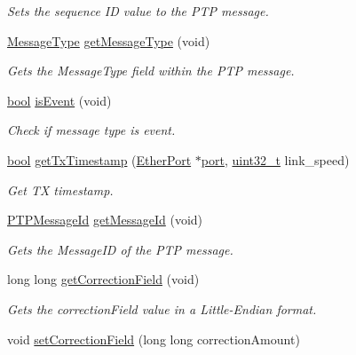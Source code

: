 \begin{DoxyCompactItemize}
\begin{DoxyCompactList}\small\item\em Sets the sequence ID value to the P\+TP message. \end{DoxyCompactList}\item 
\hyperlink{avbts__message_8hpp_ac6606ebe91c8ac66a2c314c79f5ab013}{Message\+Type} \hyperlink{class_p_t_p_message_common_aa9e0a02eadc0da0ddbade7fdb09d9309}{get\+Message\+Type} (void)
\begin{DoxyCompactList}\small\item\em Gets the Message\+Type field within the P\+TP message. \end{DoxyCompactList}\item 
\hyperlink{avb__gptp_8h_af6a258d8f3ee5206d682d799316314b1}{bool} \hyperlink{class_p_t_p_message_common_a2dd36fdb6a9dbfcfdab03f6162581373}{is\+Event} (void)
\begin{DoxyCompactList}\small\item\em Check if message type is event. \end{DoxyCompactList}\item 
\hyperlink{avb__gptp_8h_af6a258d8f3ee5206d682d799316314b1}{bool} \hyperlink{class_p_t_p_message_common_a715dccee35cbc56372f8b003600b8ef9}{get\+Tx\+Timestamp} (\hyperlink{class_ether_port}{Ether\+Port} $\ast$\hyperlink{gst__avb__playbin_8c_a63c89c04d1feae07ca35558055155ffb}{port}, \hyperlink{parse_8c_a6eb1e68cc391dd753bc8ce896dbb8315}{uint32\+\_\+t} link\+\_\+speed)
\begin{DoxyCompactList}\small\item\em Get TX timestamp. \end{DoxyCompactList}\item 
\hyperlink{class_p_t_p_message_id}{P\+T\+P\+Message\+Id} \hyperlink{class_p_t_p_message_common_a5cd92d7e4383eedc84db3781940ba4e0}{get\+Message\+Id} (void)
\begin{DoxyCompactList}\small\item\em Gets the Message\+ID of the P\+TP message. \end{DoxyCompactList}\item 
long long \hyperlink{class_p_t_p_message_common_a9930feb44509700c6a81aa4e747357ca}{get\+Correction\+Field} (void)
\begin{DoxyCompactList}\small\item\em Gets the correction\+Field value in a Little-\/\+Endian format. \end{DoxyCompactList}\item 
void \hyperlink{class_p_t_p_message_common_acecb3e9987905070c3e9d089bae8e70d}{set\+Correction\+Field} (long long correction\+Amount)

\end{DoxyCompactItemize}
